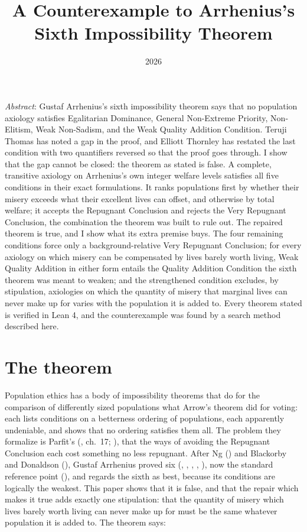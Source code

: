 \documentclass[
  11pt,
  letterpaper,
  DIV=11,
  numbers=noendperiod,
  twoside]{scrartcl}
\title{A Counterexample to Arrhenius's Sixth Impossibility Theorem}
\author{}
\date{2026}
\renewenvironment{abstract}
 {\vspace{-1.25cm}
 \quotation\small\noindent\emph{Abstract}:}
 {\endquotation}
\renewenvironment{abstract}
 {\quotation\small\noindent\emph{Abstract}:}
 {\endquotation\vspace{-0.02cm}}
\begin{document}
\maketitle
\begin{abstract}
Gustaf Arrhenius's sixth impossibility theorem says that no population
axiology satisfies Egalitarian Dominance, General Non-Extreme Priority,
Non-Elitism, Weak Non-Sadism, and the Weak Quality Addition Condition.
Teruji Thomas has noted a gap in the proof, and Elliott Thornley has
restated the last condition with two quantifiers reversed so that the
proof goes through. I show that the gap cannot be closed: the theorem as
stated is false. A complete, transitive axiology on Arrhenius's own
integer welfare levels satisfies all five conditions in their exact
formulations. It ranks populations first by whether their misery exceeds
what their excellent lives can offset, and otherwise by total welfare;
it accepts the Repugnant Conclusion and rejects the Very Repugnant
Conclusion, the combination the theorem was built to rule out. The
repaired theorem is true, and I show what its extra premise buys. The
four remaining conditions force only a background-relative Very
Repugnant Conclusion; for every axiology on which misery can be
compensated by lives barely worth living, Weak Quality Addition in
either form entails the Quality Addition Condition the sixth theorem was
meant to weaken; and the strengthened condition excludes, by
stipulation, axiologies on which the quantity of misery that marginal
lives can never make up for varies with the population it is added to.
Every theorem stated is verified in Lean 4, and the counterexample was
found by a search method described here.
\end{abstract}


\section{The theorem}\label{sec-intro}

Population ethics has a body of impossibility theorems that do for the
comparison of differently sized populations what Arrow's theorem did for
voting: each lists conditions on a betterness ordering of populations,
each apparently undeniable, and shows that no ordering satisfies them
all. The problem they formalize is Parfit's
(, ch.~17;
), that the ways of avoiding the
Repugnant Conclusion each cost something no less repugnant. After Ng
() and Blackorby and Donaldson
(), Gustaf Arrhenius proved
six (,
,
, ,
), now the standard reference point
(), and regards the sixth as
best, because its conditions are logically the weakest. This paper shows
that it is false, and that the repair which makes it true adds exactly
one stipulation: that the quantity of misery which lives barely worth
living can never make up for must be the same whatever population it is
added to. The theorem says:
\end{document}
